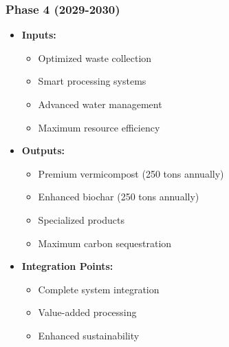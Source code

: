 \subsubsection{Phase 4 (2029-2030)}
\begin{itemize}
    \item \textbf{Inputs:}
    \begin{itemize}
        \item Optimized waste collection
        \item Smart processing systems
        \item Advanced water management
        \item Maximum resource efficiency
    \end{itemize}
    \item \textbf{Outputs:}
    \begin{itemize}
        \item Premium vermicompost (250 tons annually)
        \item Enhanced biochar (250 tons annually)
        \item Specialized products
        \item Maximum carbon sequestration
    \end{itemize}
    \item \textbf{Integration Points:}
    \begin{itemize}
        \item Complete system integration
        \item Value-added processing
        \item Enhanced sustainability
    \end{itemize}
\end{itemize}

